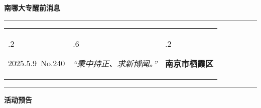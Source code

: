\documentclass[letterpaper, 12pt]{article}
\begin{document}
\begin{center}
    \Huge\textbf{南哪大专醒前消息}
\end{center}
\vspace{4mm}
\hrule
\renewcommand\tabularxcolumn[1]{m{#1}}
\begin{tabularx}{\textwidth}{>{\hsize.2\hsize}X>{\hsize.6\hsize}X>{\hsize.2\hsize}X}
    \begin{flushleft}
        2025.5.9\, No.240
    \end{flushleft}
    &
    \begin{center}
        \textit{“秉中持正、求新博闻。”}
    \end{center}
    &
    \begin{flushright}
        \textbf{南京市栖霞区}
    \end{flushright}
\end{tabularx}
\vspace{-3.5mm}
\hrule
\vspace{4mm}
\centerline{\huge\textbf{活动预告}}
\end{document}
